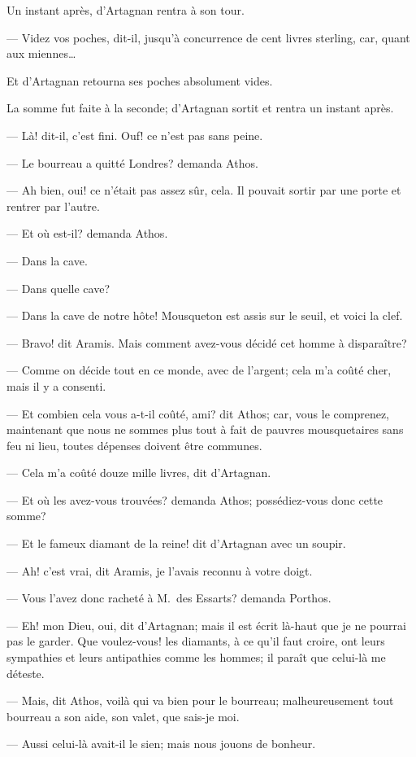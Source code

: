 Un instant après, d'Artagnan rentra à son tour.

— Videz vos poches, dit-il, jusqu'à concurrence de cent livres sterling, car, quant aux miennes\dots

Et d'Artagnan retourna ses poches absolument vides.

La somme fut faite à la seconde; d'Artagnan sortit et rentra un instant après.

— Là! dit-il, c'est fini. Ouf! ce n'est pas sans peine.

— Le bourreau a quitté Londres? demanda Athos.

— Ah bien, oui! ce n'était pas assez sûr, cela. Il pouvait sortir par une porte et rentrer par l'autre.

— Et où est-il? demanda Athos.

— Dans la cave.

— Dans quelle cave?

— Dans la cave de notre hôte! Mousqueton est assis sur le seuil, et voici la clef.

— Bravo! dit Aramis. Mais comment avez-vous décidé cet homme à disparaître?

— Comme on décide tout en ce monde, avec de l'argent; cela m'a coûté cher, mais il y a consenti.

— Et combien cela vous a-t-il coûté, ami? dit Athos; car, vous le comprenez, maintenant que nous ne sommes plus tout à fait de pauvres mousquetaires sans feu ni lieu, toutes dépenses doivent être communes.

— Cela m'a coûté douze mille livres, dit d'Artagnan.

— Et où les avez-vous trouvées? demanda Athos; possédiez-vous donc cette somme?

— Et le fameux diamant de la reine! dit d'Artagnan avec un soupir.

— Ah! c'est vrai, dit Aramis, je l'avais reconnu à votre doigt.

— Vous l'avez donc racheté à M.~des Essarts? demanda Porthos.

— Eh! mon Dieu, oui, dit d'Artagnan; mais il est écrit là-haut que je ne pourrai pas le garder. Que voulez-vous! les diamants, à ce qu'il faut croire, ont leurs sympathies et leurs antipathies comme les hommes; il paraît que celui-là me déteste.

— Mais, dit Athos, voilà qui va bien pour le bourreau; malheureusement tout bourreau a son aide, son valet, que sais-je moi.

— Aussi celui-là avait-il le sien; mais nous jouons de bonheur.

